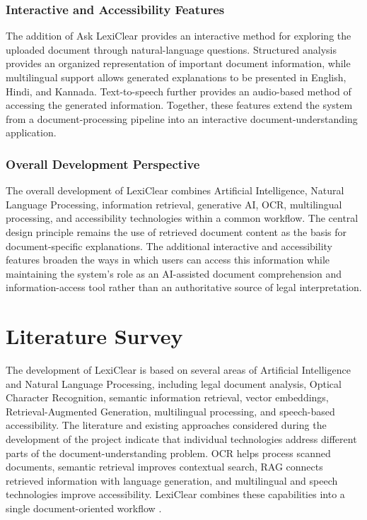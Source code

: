 \documentclass[12pt,a4paper,oneside]{report}
\begin{document}
\subsection{Interactive and Accessibility Features}

The addition of Ask LexiClear provides an interactive method for exploring
the uploaded document through natural-language questions. Structured analysis
provides an organized representation of important document information,
while multilingual support allows generated explanations to be presented in
English, Hindi, and Kannada. Text-to-speech further provides an audio-based
method of accessing the generated information. Together, these features
extend the system from a document-processing pipeline into an interactive
document-understanding application.

\subsection{Overall Development Perspective}

The overall development of LexiClear combines Artificial Intelligence,
Natural Language Processing, information retrieval, generative AI, OCR,
multilingual processing, and accessibility technologies within a common
workflow. The central design principle remains the use of retrieved document
content as the basis for document-specific explanations. The additional
interactive and accessibility features broaden the ways in which users can
access this information while maintaining the system's role as an
AI-assisted document comprehension and information-access tool rather than an
authoritative source of legal interpretation.

\chapter{Literature Survey}

The development of LexiClear is based on several areas of Artificial Intelligence
and Natural Language Processing, including legal document analysis, Optical
Character Recognition, semantic information retrieval, vector embeddings,
Retrieval-Augmented Generation, multilingual processing, and speech-based
accessibility. The literature and existing approaches considered during the
development of the project indicate that individual technologies address
different parts of the document-understanding problem. OCR helps process
scanned documents, semantic retrieval improves contextual search, RAG connects
retrieved information with language generation, and multilingual and speech
technologies improve accessibility. LexiClear combines these capabilities into a single
document-oriented workflow \cite{mahoney2019,kandula2023,jurisai2025}.
\end{document}

